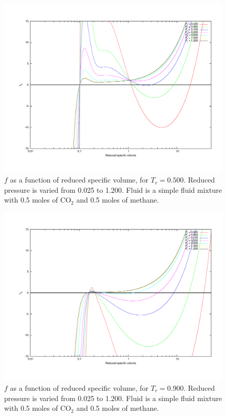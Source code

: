 \documentclass[english]{../thermomemo/thermomemo}
\numberwithin{equation}{section}
\begin{document}
\begin{figure}[h]
  \centering
  \includegraphics[trim = 1.5cm 2cm 0 1cm, clip = true, width=14cm]{05Tc_3}
  \caption{$f$ as a function of reduced specific volume, for $T_r = 0.500$. Reduced pressure is varied from 0.025 to 1.200. Fluid is a simple fluid mixture with 0.5 moles of CO$_2$ and 0.5 moles of methane.}
  \label{fig:0.5Tc}
\end{figure}

\begin{figure}[h]
  \centering
  \includegraphics[trim = 1.5cm 2cm 0 1cm, clip = true, width=14cm]{09Tc_3}
  \caption{$f$ as a function of reduced specific volume, for $T_r = 0.900$. Reduced pressure is varied from 0.025 to 1.200. Fluid is a simple fluid mixture with 0.5 moles of CO$_2$ and 0.5 moles of methane.}
  \label{fig:0.9Tc}
\end{figure}
\end{document}
